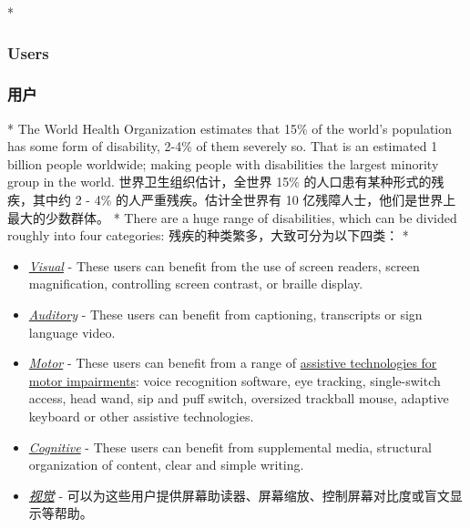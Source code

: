 \begin{paracol}{2} 
 
\switchcolumn[0]*%
\subsubsection{Users}
\switchcolumn
\subsubsection{用户}
\switchcolumn[0]*%
The World Health Organization estimates that 15\% of the world's
population has some form of disability, 2-4\% of them severely so. That
is an estimated 1 billion people worldwide; making people with
disabilities the largest minority group in the world.
\switchcolumn
世界卫生组织估计，全世界 15\% 的人口患有某种形式的残疾，其中约 2 - 4\%
的人严重残疾。估计全世界有 10 亿残障人士，他们是世界上最大的少数群体。
\switchcolumn[0]*%
There are a huge range of disabilities, which can be divided roughly
into four categories:
\switchcolumn
残疾的种类繁多，大致可分为以下四类：
\switchcolumn[0]*%
\begin{itemize}
\item
  \emph{\href{https://webaim.org/articles/visual/}{Visual}} - These
  users can benefit from the use of screen readers, screen
  magnification, controlling screen contrast, or braille display.
\item
  \emph{\href{https://webaim.org/articles/auditory/}{Auditory}} - These
  users can benefit from captioning, transcripts or sign language video.
\item
  \emph{\href{https://webaim.org/articles/motor/}{Motor}} - These users
  can benefit from a range of
  \href{https://webaim.org/articles/motor/assistive}{assistive
  technologies for motor impairments}: voice recognition software, eye
  tracking, single-switch access, head wand, sip and puff switch,
  oversized trackball mouse, adaptive keyboard or other assistive
  technologies.
\item
  \emph{\href{https://webaim.org/articles/cognitive/}{Cognitive}} -
  These users can benefit from supplemental media, structural
  organization of content, clear and simple writing.
\end{itemize}
\switchcolumn
\begin{itemize}
\item
  \emph{\href{https://webaim.org/articles/visual/}{视觉}} -
  可以为这些用户提供屏幕助读器、屏幕缩放、控制屏幕对比度或盲文显示等帮助。

\end{itemize}
\end{paracol}

